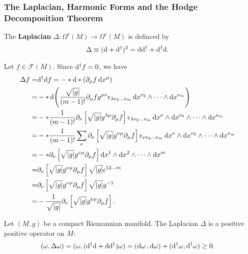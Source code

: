 \documentclass[10pt]{article}
\begin{document}
\subsubsection{The Laplacian, Harmonic Forms and the Hodge Decomposition Theorem}
\begin{definition}[Laplacian]
    The \textbf{Laplacian} $\Delta:\Omega^r(M)\to\Omega^r(M)$ is definced by
    \begin{align}
        \Delta\equiv(\mathrm{d}+\mathrm{d}^\dagger)^2=\mathrm{d}\mathrm{d}^\dagger+\mathrm{d}^\dagger\mathrm{d}.
    \end{align}
\end{definition}
\begin{example}
    Let $f\in\mathcal{F}(M)$.
    Since $\mathrm{d}^\dagger f=0$, we have
    \begin{align}
        \Delta f= & \mathrm{d}^\dagger\mathrm{d} f=-\ast\mathrm{d}\ast\left(\partial_\mu f\dd{x^\mu}\right)\notag                                                                                                                       \\
        =         & -\ast\dd(\frac{\sqrt{\abs{g}}}{(m-1)!}\partial_\mu fg^{\mu\nu}\epsilon_{\lambda\nu_2\dots\nu_m}\dd{x^{\nu_2}}\wedge\dots\wedge\dd{x^{\nu_m}})\notag                                            \\
        =         & -\ast\frac{1}{(m-1)!}\partial_\nu\left[\sqrt{\abs{g}}g^{\lambda\mu}\partial_\mu f\right]\epsilon_{\lambda\nu_2\dots\nu_m}\dd{x^\nu}\wedge\dd{x^{\nu_2}}\wedge\dots\wedge\dd{x^{\nu_m}}\notag   \\
        =         & -\ast\frac{1}{(m-1)!}\sum_{\nu}\partial_\nu\left[\sqrt{\abs{g}}g^{\nu\mu}\partial_\mu f\right]\epsilon_{\nu\nu_2\dots\nu_m}\dd{x^\nu}\wedge\dd{x^{\nu_2}}\wedge\dots\wedge\dd{x^{\nu_m}}\notag \\
        =         & -\ast\partial_\nu\left[\sqrt{\abs{g}}g^{\nu\mu}\partial_\mu f\right]\dd{x^1}\wedge\dd{x^{2}}\wedge\dots\wedge\dd{x^{m}}\notag                                                                  \\
        =         & \partial_\nu\left[\sqrt{\abs{g}}g^{\nu\mu}\partial_\mu f\right]\sqrt{\abs{g}}\epsilon^{12\dots m}\notag                                                                                        \\
        =         & \partial_\nu\left[\sqrt{\abs{g}}g^{\nu\mu}\partial_\mu f\right]\sqrt{\abs{g}}g^{-1}\notag                                                                                                      \\
        =         & -\frac{1}{\sqrt{\abs{g}}}\partial_\nu\left[\sqrt{\abs{g}}g^{\nu\mu}\partial_\mu f\right].
    \end{align}
\end{example}
\begin{property}
    Let $(M,g)$ be a compact Riemannian manifold.
    The Laplacian $\Delta$ is a positive positive operator on $M$:
    \begin{align}
        (\omega,\Delta\omega)=(\omega,(\mathrm{d}^\dagger\mathrm{d}+\mathrm{d}\mathrm{d}^\dagger)\omega)=(\dd{\omega},\dd{\omega})+(\mathrm{d}^\dagger\omega,\mathrm{d}^\dagger\omega)\geq0.
    \end{align}
\end{property}
\end{document}
